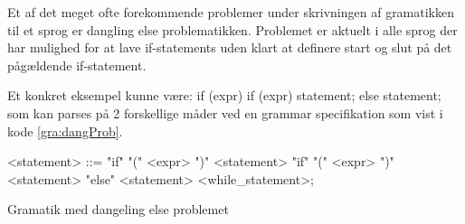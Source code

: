 


\label{subsec:danglingelse}
Et af det meget ofte forekommende problemer under skrivningen af gramatikken til et sprog er dangling else problematikken. Problemet er aktuelt i alle sprog der har mulighed for at lave if-statements uden klart at definere start og slut på det pågældende if-statement.

Et konkret eksempel kunne være: if (expr) if (expr) statement; else statement; som kan parses på 2 forskellige måder ved en grammar specifikation som vist i kode \ref{gra:dangProb}.

\begin{Grammar}
 \begin{grammar}
    <statement> ::= "if" "(" <expr> ")" <statement> 
    \alt "if" "(" <expr> ")" <statement> "else" <statement>
    \alt <while\_statement>;
 \end{grammar}
 \caption{Gramatik med dangeling else problemet}\label{gra:dangProb}
\end{Grammar}




